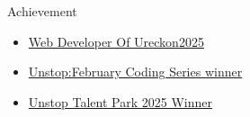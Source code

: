 \documentclass{resume}
\begin{document}
\begin{rSection}{Achievement}
    \begin{itemize}
        \item \href{https://www.linkedin.com/in/trishamandal123/overlay/1743935784621/single-media-viewer/?profileId=ACoAAD6fJSYBp1-mlWaj7Kp-LrqJQAIsUNkJcBQ}{Web Developer Of Ureckon2025}
        \item \href{https://unstop.com/certificate-preview/a2c45722-20b1-4708-81ba-74b1874823f1}{Unstop:February Coding Series winner}
        \item \href{https://unstop.com/certificate-preview/a2c45722-20b1-4708-81ba-74b1874823f1}{ Unstop Talent Park 2025 Winner}
    \end{itemize}
\end{rSection}
\vspace{-0.4em}

\end{document}
